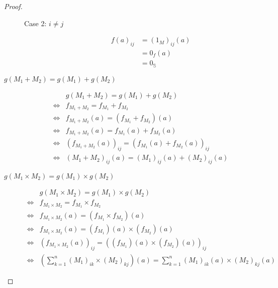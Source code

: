 \documentclass[runningheads]{llncs}
\begin{document}
\begin{proof}
\begin{description}
\begin{description}
				\item[Case 2: \(i \neq j\)]
					\begin{align*}
						f(a)_{ij} & = (1_M)_{ij}(a)                           \\
						          & = 0_f(a)\tag{by def. of \(1_M\)}          \\
						          & = 0_{\mathbb{S}} \tag{by def. of \(0_f\)}
					\end{align*}
			\end{description}

		\item[\(g(M_1 + M_2) = g(M_1) + g(M_2)\)]
			\begin{align*}
				     & g(M_1 + M_2) = g(M_1) + g(M_2)                                              \\
				\iff & f_{M_1 + M_2} = f_{M_1} + f_{M_2}                                           \\
				\iff & f_{M_1 + M_2}(a) = (f_{M_1} + f_{M_2})(a)                                   \\
				\iff & f_{M_1 + M_2}(a) = f_{M_1}(a) + f_{M_2} (a)                                 \\
				\iff & (f_{M_1 + M_2}(a))_{ij} = (f_{M_1}(a) + f_{M_2} (a))_{ij}                   \\
				\iff & (M_1 + M_2)_{ij}(a) = (M_1)_{ij}(a)+ (M_2)_{ij}(a) \tag{by assoc. of \(+\)}
			\end{align*}

		\item[\(g(M_1 \times M_2) = g(M_1) \times g(M_2)\)]
			\begin{align*}
				     & g(M_1 \times M_2) = g(M_1) \times g(M_2)                                                                                                      \\
				\iff & f_{M_1 \times M_2} = f_{M_1} \times f_{M_2}                                                                                                   \\
				\iff & f_{M_1 \times M_2}(a) = (f_{M_1} \times f_{M_2})(a)                                                                                           \\
				\iff & f_{M_1 \times M_2}(a) = (f_{M_1})(a) \times (f_{M_2})(a)                                                                                      \\
				\iff & (f_{M_1 \times M_2}(a))_{ij} = ((f_{M_1})(a) \times (f_{M_2})(a))_{ij}                                                                        \\
				\iff & (\sum_{k=1}^{n} (M_1)_{ik} \times (M_2)_{kj})(a) = \sum_{k=1}^{n} (M_1)_{ik}(a) \times (M_2)_{kj}(a) \tag{by assoc. of \(+\) and \(\times \)}
			\end{align*}
			\qedhere
	\end{description}
\end{proof}
\end{document}
